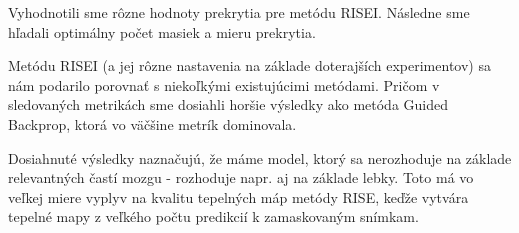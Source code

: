 Vyhodnotili sme rôzne hodnoty prekrytia pre metódu RISEI. Následne sme hľadali optimálny počet masiek a mieru prekrytia.

Metódu RISEI (a jej rôzne nastavenia na základe doterajších experimentov) sa nám podarilo porovnať s niekoľkými existujúcimi metódami. Pričom v sledovaných metrikách sme dosiahli horšie výsledky ako metóda Guided Backprop, ktorá vo väčšine metrík dominovala.

Dosiahnuté výsledky naznačujú, že máme model, ktorý sa nerozhoduje na základe relevantných častí mozgu - rozhoduje napr. aj na základe lebky. Toto má vo veľkej miere vyplyv na kvalitu tepelných máp metódy RISE, keďže vytvára tepelné mapy z veľkého počtu predikcií k zamaskovaným snímkam.








